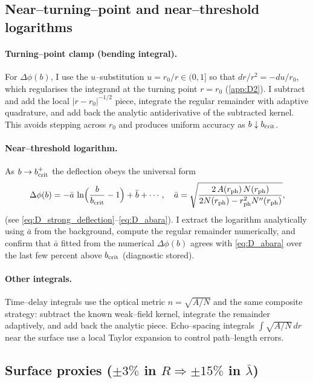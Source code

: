 \documentclass{iopjournal}
\begin{document}
\subsection{Near–turning–point and near–threshold logarithms}\label{app:K2}
\paragraph{Turning–point clamp (bending integral).}
For $\Delta\phi(b)$, I use the $u$–substitution $u=r_0/r\in(0,1]$ so that $dr/r^2=-du/r_0$, which regularises the integrand at the turning point $r=r_0$ (\cref{app:D2}). I subtract and add the local $|r-r_0|^{-1/2}$ piece, integrate the regular remainder with adaptive quadrature, and add back the analytic antiderivative of the subtracted kernel. This avoids stepping across $r_0$ and produces uniform accuracy as $b\downarrow b_{\rm crit}$.

\paragraph{Near–threshold logarithm.}
As $b\to b_{\rm crit}^+$ the deflection obeys the universal form
\[
\Delta\phi(b)=-\bar a\,\ln\!\Big(\frac{b}{b_{\rm crit}}-1\Big)+\bar b+\cdots,
\quad
\bar a=\sqrt{\frac{2\,A(r_{\rm ph})\,N(r_{\rm ph})}{2N(r_{\rm ph})-r_{\rm ph}^{2}N''(r_{\rm ph})}},
\]
(see \eqref{eq:D_strong_deflection}–\eqref{eq:D_abara}). I extract the logarithm analytically using $\bar a$ from the background, compute the regular remainder numerically, and confirm that $\bar a$ fitted from the numerical $\Delta\phi(b)$ agrees with \eqref{eq:D_abara} over the last few percent above $b_{\rm crit}$ (diagnostic stored).

\paragraph{Other integrals.}
Time–delay integrals use the optical metric $n=\sqrt{A/N}$ and the same composite strategy: subtract the known weak–field kernel, integrate the remainder adaptively, and add back the analytic piece. Echo–spacing integrals $\int\sqrt{A/N}\,dr$ near the surface use a local Taylor expansion to control path–length errors.


\subsection{\texorpdfstring{Surface proxies ($\pm3\%$ in $R\Rightarrow \pm15\%$ in $\bar\lambda$)}{Surface proxies (+/-3\% in R => +/-15\% in barlambda)}}\label{app:K3}
\end{document}
